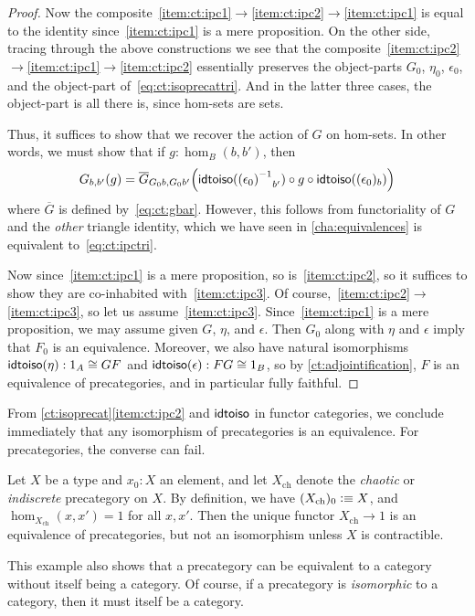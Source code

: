 \begin{proof}
  Now the composite~\ref{item:ct:ipc1}$\to$\ref{item:ct:ipc2}$\to$\ref{item:ct:ipc1} is equal to the identity since~\ref{item:ct:ipc1} is a mere proposition.
  On the other side, tracing through the above constructions we see that the composite~\ref{item:ct:ipc2}$\to$\ref{item:ct:ipc1}$\to$\ref{item:ct:ipc2} essentially preserves the object-parts $G_0$, $\eta_0$, $\epsilon_0$, and the object-part of~\eqref{eq:ct:isoprecattri}.
  And in the latter three cases, the object-part is all there is, since hom-sets are sets.

  Thus, it suffices to show that we recover the action of $G$ on hom-sets.
  In other words, we must show that if $g:\hom_B(b,b')$, then
  \[ G_{b,b'}(g) =
  \overline{G}_{G_0b,G_0b'}\Big(\mathsf{idtoiso}(\mathord{{(\epsilon_0)}^{-1}}_{b'}) \circ g \circ \mathsf{idtoiso}((\epsilon_0)_b)\Big)
  \]
  where $\overline{G}$ is defined by~\eqref{eq:ct:gbar}.
  However, this follows from functoriality of $G$ and the \emph{other} triangle identity, which we have seen in \autoref{cha:equivalences} is equivalent to~\eqref{eq:ct:ipctri}.

  Now since~\ref{item:ct:ipc1} is a mere proposition, so is~\ref{item:ct:ipc2}, so it suffices to show they are co-inhabited with~\ref{item:ct:ipc3}.
  Of course,~\ref{item:ct:ipc2}$\to$\ref{item:ct:ipc3}, so let us assume~\ref{item:ct:ipc3}.
  Since~\ref{item:ct:ipc1} is a mere proposition, we may assume given $G$, $\eta$, and $\epsilon$.
  Then $G_0$ along with $\eta$ and $\epsilon$ imply that $F_0$ is an equivalence.
  Moreover, we also have natural isomorphisms $\mathsf{idtoiso}(\eta):1_A\cong GF$ and $\mathsf{idtoiso}(\epsilon):FG\cong 1_B$, so by \autoref{ct:adjointification}, $F$ is an equivalence of precategories, and in particular fully faithful.
\end{proof}

From \autoref{ct:isoprecat}\ref{item:ct:ipc2} and $\mathsf{idtoiso}$ in functor categories, we conclude immediately that any isomorphism of precategories is an equivalence.
For precategories, the converse can fail.

\begin{eg}\label{ct:chaotic}
  Let $X$ be a type and $x_0:X$ an element, and let $X_{\mathrm{ch}}$ denote the \emph{chaotic} or \emph{indiscrete} precategory on $X$.
  By definition, we have $(X_{\mathrm{ch}})_0\vcentcolon\equiv X$, and $\hom_{X_{\mathrm{ch}}}(x,x') = 1$ for all $x,x'$.
  Then the unique functor $X_{\mathrm{ch}}\to 1$ is an equivalence of precategories, but not an isomorphism unless $X$ is contractible.

  This example also shows that a precategory can be equivalent to a category without itself being a category.
  Of course, if a precategory is \emph{isomorphic} to a category, then it must itself be a category.
\end{eg}

